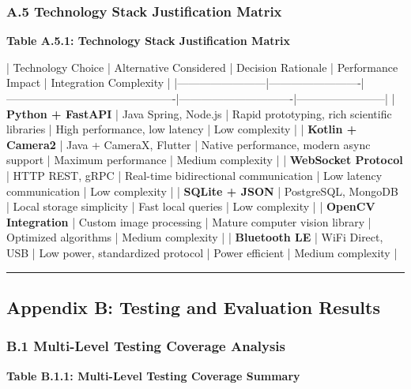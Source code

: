 \documentclass[12pt,a4paper]{article}
\begin{document}
\subsubsection{A.5 Technology Stack Justification Matrix}

\textbf{Table A.5.1: Technology Stack Justification Matrix}

| Technology Choice      | Alternative Considered  | Decision Rationale                           | Performance Impact            | Integration Complexity |
|------------------------|-------------------------|----------------------------------------------|-------------------------------|------------------------|
| \textbf{Python + FastAPI}   | Java Spring, Node.js    | Rapid prototyping, rich scientific libraries | High performance, low latency | Low complexity         |
| \textbf{Kotlin + Camera2}   | Java + CameraX, Flutter | Native performance, modern async support     | Maximum performance           | Medium complexity      |
| \textbf{WebSocket Protocol} | HTTP REST, gRPC         | Real-time bidirectional communication        | Low latency communication     | Low complexity         |
| \textbf{SQLite + JSON}      | PostgreSQL, MongoDB     | Local storage simplicity                     | Fast local queries            | Low complexity         |
| \textbf{OpenCV Integration} | Custom image processing | Mature computer vision library               | Optimized algorithms          | Medium complexity      |
| \textbf{Bluetooth LE}       | WiFi Direct, USB        | Low power, standardized protocol             | Power efficient               | Medium complexity      |

\hrule

\subsection{Appendix B: Testing and Evaluation Results}

\subsubsection{B.1 Multi-Level Testing Coverage Analysis}

\textbf{Table B.1.1: Multi-Level Testing Coverage Summary}
\end{document}
